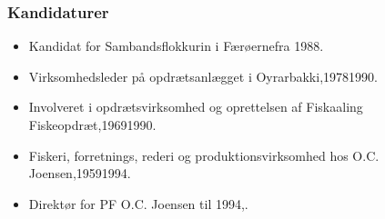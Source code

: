 \documentclass[11pt, a4paper]{awesome-cv}
\begin{document}
\begin{cvletter}
\subsubsection*{Kandidaturer}
\begin{itemize}
\item Kandidat for Sambandsflokkurin i Færøernefra 1988.
\end{itemize}
\begin{itemize}
\item Virksomhedsleder på opdrætsanlægget i Oyrarbakki,19781990.
\item Involveret i opdrætsvirksomhed og oprettelsen af Fiskaaling Fiskeopdræt,19691990.
\item Fiskeri, forretnings, rederi og produktionsvirksomhed hos O.C. Joensen,19591994.
\item Direktør for PF O.C. Joensen til 1994,.
\end{itemize}
\end{cvletter}
\end{document}
